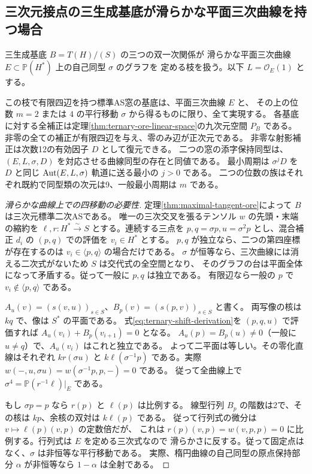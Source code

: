 \subsection{三次元接点の三生成基底が滑らかな平面三次曲線を持つ場合}
\label{sec:elliptic-tangent-windows}
三生成基底 $B=T(H)/(S)$ の三つの双一次関係が
滑らかな平面三次曲線 $E\subset\mathbb P(H^*)$ 上の自己同型 $\sigma$ のグラフを
定める枝を扱う。以下 $L=\mathcal O_E(1)$ とする。

\begin{theorem}\label{thm:elliptic-tangent-classification}
この枝で有限四辺を持つ標準AS窓の基底は、平面三次曲線 $E$ と、
その上の位数 $m=2$ または $4$ の平行移動 $\sigma$ から得るものに限り、全て実現する。
各基底に対する全補正は定理\ref{thm:ternary-ore-linear-space}の九次元空間 $P_B$ である。
非零の全ての補正が有限四辺を与え、零のみ辺が正次元である。
非零な射影補正は次数12の有効因子 $D$ として復元できる。
二つの窓の添字保持同型は、$(E,L,\sigma,D)$ を対応させる曲線同型の存在と同値である。
最小周期は $\sigma^jD$ を $D$ と同じ $\operatorname{Aut}(E,L,\sigma)$ 軌道に送る最小の $j>0$ である。
二つの位数の族はそれぞれ既約で同型類の次元は9、一般最小周期は $m$ である。
\end{theorem}

\begin{proof}[滑らかな曲線上での四移動の必要性]
定理\ref{thm:maximal-tangent-ore}によって $B$ は三次元標準二次ASである。
唯一の三次交叉を張るテンソル $w$ の先頭・末端の縮約を
$\ell,r:H^*\xrightarrow{\sim}S$ とする。連続する三点を $p,q=\sigma p,u=\sigma^2p$
とし、混合補正 $d_i$ の $(p,q)$ での評価を $v_i\in H^*$ とする。
$p,q$ が独立なら、二つの第四座標が存在するのは $v_i\in\langle p,q\rangle$ の場合だけである。
$\sigma$ が恒等なら、三次曲線には消える二次式がないため $S$ は交代式の全空間となり、
そのグラフの台は平面全体になって矛盾する。従って一般に $p,q$ は独立である。
有限辺なら一般の $p$ で $v_i\notin\langle p,q\rangle$ である。

$A_u(v)=(s(v,u))_{s\in S}$、$B_p(v)=(s(p,v))_{s\in S}$ と書く。
両写像の核は $kq$ で、像は $S^*$ の平面である。
式\eqref{eq:ternary-shift-derivation}を $(p,q,u)$ で評価すれば
$A_u(v_i)+B_p(v_{i+1})=0$ となる。
$A_u(p)=B_p(u)\ne0$（一般に $u\ne q$）で、$A_u(v_i)$ はこれと独立である。
よって二平面は等しい。その零化直線はそれぞれ $kr(\sigma u)$ と
$k\ell(\sigma^{-1}p)$ である。実際 $w(-,u,\sigma u)=w(\sigma^{-1}p,p,-)=0$ である。
従って全曲線上で $\sigma^4=\mathbb P(r^{-1}\ell)|_E$ である。

もし $\sigma p=p$ なら $r(p)$ と $\ell(p)$ は比例する。
線型行列 $B_p$ の階数は2で、その核は $kp$、余核の双対は $k\ell(p)$ である。
従って行列式の微分は $v\mapsto\ell(p)(v,p)$ の定数倍だが、
これは $r(p)(v,p)=w(v,p,p)=0$ に比例する。行列式は $E$ を定める三次式なので
滑らかさに反する。従って固定点はなく、$\sigma$ は非恒等な平行移動である。
実際、楕円曲線の自己同型の原点保持部分 $\alpha$ が非恒等なら $1-\alpha$ は全射である。
\end{proof}

